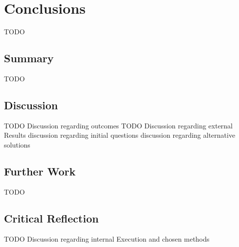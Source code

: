 \chapter{Conclusions}
\label{chap:concl}

TODO

\section{Summary}

TODO

\section{Discussion}

TODO Discussion regarding outcomes
TODO Discussion regarding external Results
discussion regarding initial questions
discussion regarding alternative solutions

\section{Further Work}

TODO

\section{Critical Reflection}

TODO  Discussion regarding internal Execution and chosen methods